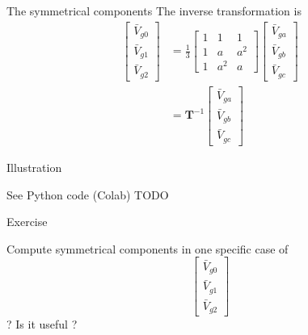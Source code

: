\begin{frame}[allowframebreaks]{The symmetrical components}
The inverse transformation is 
\begin{align}
\left[\begin{array}{l}\bar{V}_{g0} \\ \bar{V}_{g1} \\ \bar{V}_{g2}\end{array}\right]
    & = \frac{1}{3}\left[
    \begin{array}{ccc}1 & 1 & 1 \\ 
    1 & a & a^2 \\ 
    1 & a^2 & a
    \end{array}\right]
     \left[\begin{array}{l}\bar{V}_{ga} \\ \bar{V}_{gb} \\ \bar{V}_{gc}\end{array}\right] \\
    & = \mathbf{T}^{-1} \left[\begin{array}{l}\bar{V}_{ga} \\ \bar{V}_{gb} \\ \bar{V}_{gc}\end{array}\right]
\end{align}
\end{frame}


\begin{frame}{Illustration}

See Python code (Colab) TODO    

\end{frame}

\begin{frame}{Exercise}

Compute symmetrical components in one specific case of $$\left[\begin{array}{l}\bar{V}_{g0} \\ \bar{V}_{g1} \\ \bar{V}_{g2}\end{array}\right]$$ ?
Is it useful ? 

\end{frame}


